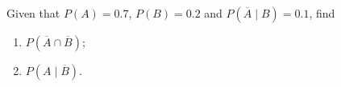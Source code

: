 Given that $P(A)=0.7$, $P(B)=0.2$ and $P\left(\overline{A}\mid B\right)=0.1$, find
\begin{enumerate}
\item[(a)] $P\left(\overline{A}\cap\overline{B}\right)$;
\item[(b)] $P\left(A\mid\overline{B}\right)$.
\end{enumerate}
